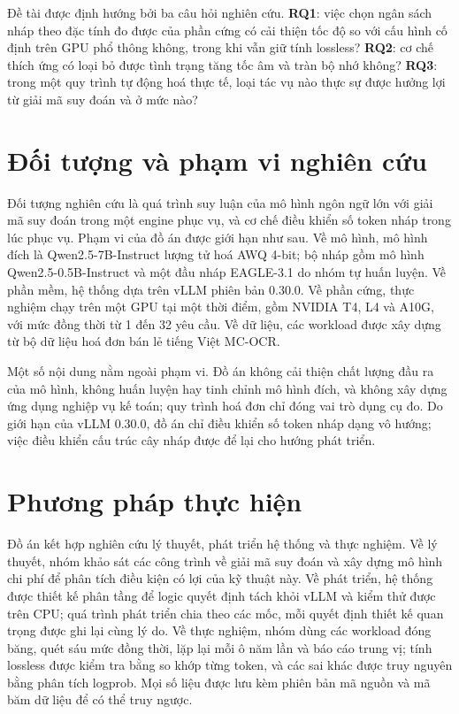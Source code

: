 Đề tài được định hướng bởi ba câu hỏi nghiên cứu. \textbf{RQ1}: việc chọn ngân sách nháp theo đặc tính đo được của phần cứng có cải thiện tốc độ so với cấu hình cố định trên GPU phổ thông không, trong khi vẫn giữ tính lossless? \textbf{RQ2}: cơ chế thích ứng có loại bỏ được tình trạng tăng tốc âm và tràn bộ nhớ không? \textbf{RQ3}: trong một quy trình tự động hoá thực tế, loại tác vụ nào thực sự được hưởng lợi từ giải mã suy đoán và ở mức nào?

\section*{Đối tượng và phạm vi nghiên cứu}

Đối tượng nghiên cứu là quá trình suy luận của mô hình ngôn ngữ lớn với giải mã suy đoán trong một engine phục vụ, và cơ chế điều khiển số token nháp trong lúc phục vụ. Phạm vi của đồ án được giới hạn như sau. Về mô hình, mô hình đích là Qwen2.5-7B-Instruct lượng tử hoá AWQ 4-bit; bộ nháp gồm mô hình Qwen2.5-0.5B-Instruct và một đầu nháp EAGLE-3.1 do nhóm tự huấn luyện. Về phần mềm, hệ thống dựa trên vLLM phiên bản 0.30.0. Về phần cứng, thực nghiệm chạy trên một GPU tại một thời điểm, gồm NVIDIA T4, L4 và A10G, với mức đồng thời từ 1 đến 32 yêu cầu. Về dữ liệu, các workload được xây dựng từ bộ dữ liệu hoá đơn bán lẻ tiếng Việt MC-OCR.

Một số nội dung nằm ngoài phạm vi. Đồ án không cải thiện chất lượng đầu ra của mô hình, không huấn luyện hay tinh chỉnh mô hình đích, và không xây dựng ứng dụng nghiệp vụ kế toán; quy trình hoá đơn chỉ đóng vai trò dụng cụ đo. Do giới hạn của vLLM 0.30.0, đồ án chỉ điều khiển số token nháp dạng vô hướng; việc điều khiển cấu trúc cây nháp được để lại cho hướng phát triển.

\section*{Phương pháp thực hiện}

Đồ án kết hợp nghiên cứu lý thuyết, phát triển hệ thống và thực nghiệm. Về lý thuyết, nhóm khảo sát các công trình về giải mã suy đoán và xây dựng mô hình chi phí để phân tích điều kiện có lợi của kỹ thuật này. Về phát triển, hệ thống được thiết kế phân tầng để logic quyết định tách khỏi vLLM và kiểm thử được trên CPU; quá trình phát triển chia theo các mốc, mỗi quyết định thiết kế quan trọng được ghi lại cùng lý do. Về thực nghiệm, nhóm dùng các workload đóng băng, quét sáu mức đồng thời, lặp lại mỗi ô năm lần và báo cáo trung vị; tính lossless được kiểm tra bằng so khớp từng token, và các sai khác được truy nguyên bằng phân tích logprob. Mọi số liệu được lưu kèm phiên bản mã nguồn và mã băm dữ liệu để có thể truy ngược.

